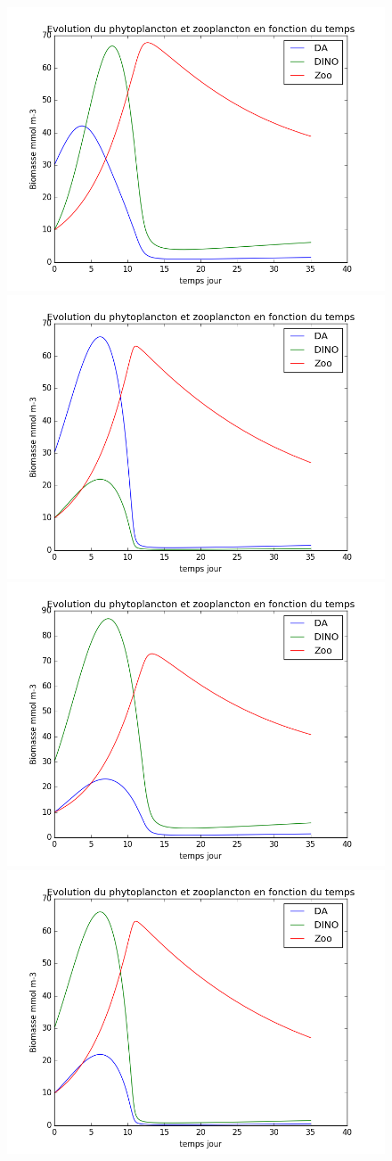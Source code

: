 \begin{figure}
  \includegraphics[width=.5\textwidth]{partie2/test1sel.png}\hfill
  \includegraphics[width=.5\textwidth]{partie2/test1nonsel.png}\\
  \includegraphics[width=.5\textwidth]{partie2/test2sel.png}\hfill
  \includegraphics[width=.5\textwidth]{partie2/test2nonsel.png}
  \caption{\todo}
  \label{fig:partie2Test1}
\end{figure}
